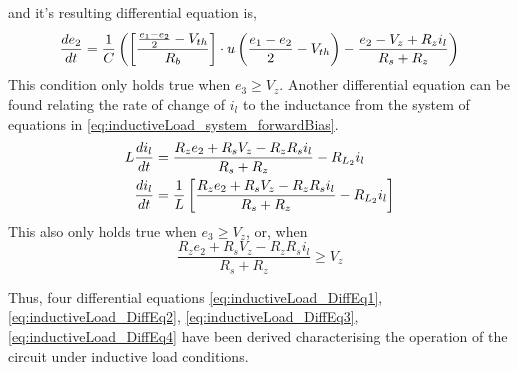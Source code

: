and it's resulting differential equation is,
\begin{equation}
	\frac{de_2}{dt} = \frac{1}{C}\left(\left[\frac{\frac{e_1 - e_2}{2} - V_{th}}{R_b} \right]\cdot u\left(\frac{e_1 - e_2}{2} - V_{th} \right) - \frac{e_2 - V_z + R_z i_l}{R_s + R_z} \right)
	\label{eq:inductiveLoad_DiffEq3}
\end{equation}
This condition only holds true when $e_3 \geq V_z$. Another differential equation can be found relating the rate of change of $i_l$ to the inductance from the system of equations in \eqref{eq:inductiveLoad_system_forwardBias}.
\begin{equation}
	\begin{split}
		L\frac{di_l}{dt} &= \frac{R_z e_2 + R_s V_z - R_z R_s i_l}{R_s + R_z} - R_{L_2}i_l \\
		 \frac{di_l}{dt} &= \frac{1}{L} \left[\frac{R_z e_2 + R_s V_z - R_z R_s i_l}{R_s + R_z} - R_{L_2}i_l \right]
	\end{split}
	\label{eq:inductiveLoad_DiffEq4}
\end{equation}
This also only holds true when $e_3 \geq V_z$, or, when
\begin{equation}
	\frac{R_z e_2 + R_s V_z - R_z R_s i_l}{R_s + R_z} \geq V_z
\end{equation}

Thus, four differential equations \eqref{eq:inductiveLoad_DiffEq1}, \eqref{eq:inductiveLoad_DiffEq2}, \eqref{eq:inductiveLoad_DiffEq3}, \eqref{eq:inductiveLoad_DiffEq4} have been derived characterising the operation of the circuit under inductive load conditions.


